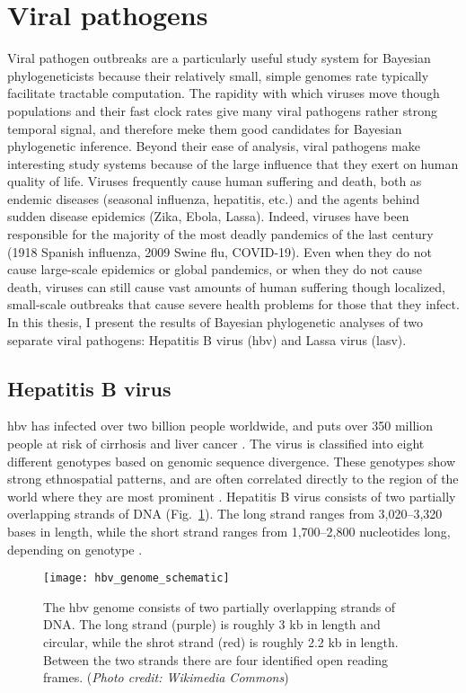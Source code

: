 \section{Viral pathogens}
Viral pathogen outbreaks are a particularly useful study system for Bayesian phylogeneticists because their relatively small, simple genomes rate typically facilitate tractable computation.
The rapidity with which viruses move though populations and their fast clock rates give many viral pathogens rather strong temporal signal, and therefore meke them good candidates for Bayesian phylogenetic inference.
Beyond their ease of analysis, viral pathogens make interesting study systems because of the large influence that they exert on human quality of life.
Viruses frequently cause human suffering and death, both as endemic diseases (seasonal influenza, hepatitis, etc.) and the agents behind sudden disease epidemics (Zika, Ebola, Lassa).
Indeed, viruses have been responsible for the majority of the most deadly pandemics of the last century (1918 Spanish influenza, 2009 Swine flu, COVID-19).
Even when they do not cause large-scale epidemics or global pandemics, or when they do not cause death, viruses can still cause vast amounts of human suffering though localized, small-scale outbreaks that cause severe health problems for those that they infect.
In this thesis, I present the results of Bayesian phylogenetic analyses of two separate viral pathogens: Hepatitis B virus (\gls{hbv}) and Lassa virus (\gls{lasv}).

\subsection{Hepatitis B virus}

\gls{hbv} has infected over two billion people worldwide, and puts over 350 million people at risk of cirrhosis and liver cancer \cite{kane1995}.
The virus is classified into eight different genotypes based on genomic sequence divergence.
These genotypes show strong ethnospatial patterns, and are often correlated directly to the region of the world where they are most prominent \cite{schaefer2007}.
Hepatitis B virus consists of two partially overlapping strands of DNA (Fig.~\ref{fig:hbvGenome}).
The long strand ranges from 3,020--3,320 bases in length, while the short strand ranges from 1,700--2,800 nucleotides long, depending on genotype \cite{kay2007_hepatitis_b_virus_genetic_variability}.

\begin{figure}[ht]
  \centering
  \medskip
  \texttt{[image: hbv\_genome\_schematic]}
  \caption[Scematic of the HBV genome]{The \gls{hbv} genome consists of two partially overlapping strands of DNA. The long strand (purple) is roughly 3 kb in length and circular, while the shrot strand (red) is roughly 2.2 kb in length. Between the two strands there are four identified open reading frames. (\textit{Photo credit: Wikimedia Commons}\cite{HBVwiki})}
  \label{fig:hbvGenome}
\end{figure}


